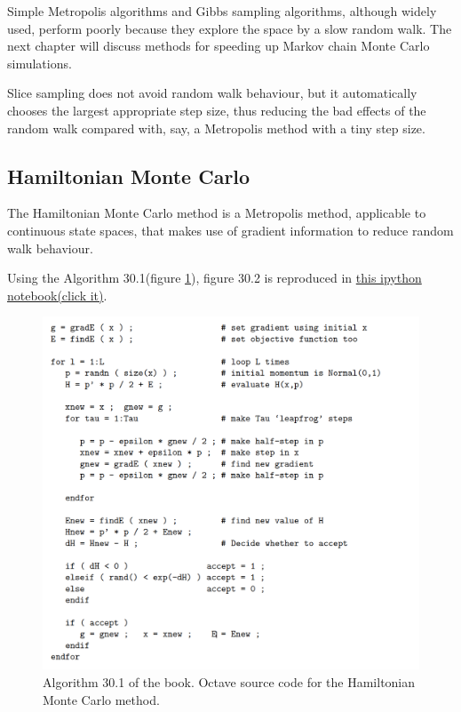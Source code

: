 \documentclass[a4paper,11pt]{article}
\numberwithin{equation}{section}
\begin{document}
{{{Simple Metropolis algorithms and Gibbs sampling algorithms, although
widely used, perform poorly because they explore the space by a slow
random walk. The next chapter will discuss methods for speeding up
Markov chain Monte Carlo simulations.


Slice sampling does not avoid random walk behaviour, but it automatically
chooses the largest appropriate step size, thus reducing the bad
effects of the random walk compared with, say, a Metropolis method
with a tiny step size.


\subsection{Hamiltonian Monte Carlo}

The Hamiltonian Monte Carlo method is a Metropolis method, applicable
to continuous state spaces, that makes use of gradient information to reduce
random walk behaviour.

Using the Algorithm 30.1(figure \ref{HMC}), figure 30.2 is reproduced in  \href{https://github.com/physhik/Study-of-David-Mackay-s-book-/blob/master/Exercise29.10.ipynb}{this ipython notebook(click it)}.


\begin{figure}[h!]
\centerline{\includegraphics[scale=0.6]{algorithmhmc.png}}
\caption{Algorithm 30.1 of the book. Octave source
code for the Hamiltonian Monte
Carlo method.}\label{HMC}
\end{figure}


}}}
\end{document}
